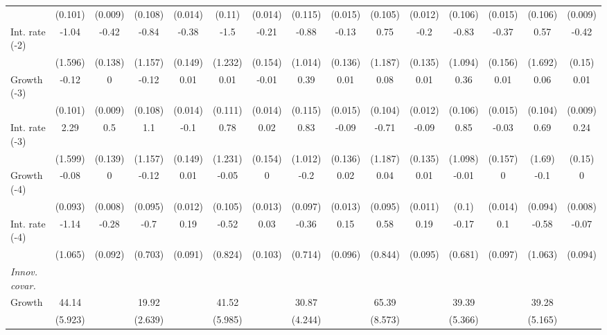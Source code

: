 \begin{table}[htbp]
\begin{tabular}{@{\extracolsep{4pt}}lcccccccccccccc@{}}
 		 & (0.101) 	 & (0.009) 	 & (0.108) 	 & (0.014) 	 & (0.11) 	 & (0.014) 	 & (0.115) 	 & (0.015) 	 & (0.105) 	 & (0.012) 	 & (0.106) 	 & (0.015) 	 & (0.106) 	 & (0.009) 	 \\ 
\quad Int. rate (-2) 	 &-1.04 	 & -0.42 	 & -0.84 	 & -0.38 	 & -1.5 	 & -0.21 	 & -0.88 	 & -0.13 	 & 0.75 	 & -0.2 	 & -0.83 	 & -0.37 	 & 0.57 	 & -0.42	 \\ 
 		 & (1.596) 	 & (0.138) 	 & (1.157) 	 & (0.149) 	 & (1.232) 	 & (0.154) 	 & (1.014) 	 & (0.136) 	 & (1.187) 	 & (0.135) 	 & (1.094) 	 & (0.156) 	 & (1.692) 	 & (0.15) 	 \\ 
\quad Growth (-3) 	 &-0.12 	 & 0 	 & -0.12 	 & 0.01 	 & 0.01 	 & -0.01 	 & 0.39 	 & 0.01 	 & 0.08 	 & 0.01 	 & 0.36 	 & 0.01 	 & 0.06 	 & 0.01	 \\ 
 		 & (0.101) 	 & (0.009) 	 & (0.108) 	 & (0.014) 	 & (0.111) 	 & (0.014) 	 & (0.115) 	 & (0.015) 	 & (0.104) 	 & (0.012) 	 & (0.106) 	 & (0.015) 	 & (0.104) 	 & (0.009) 	 \\ 
\quad Int. rate (-3) 	 &2.29 	 & 0.5 	 & 1.1 	 & -0.1 	 & 0.78 	 & 0.02 	 & 0.83 	 & -0.09 	 & -0.71 	 & -0.09 	 & 0.85 	 & -0.03 	 & 0.69 	 & 0.24	 \\ 
 		 & (1.599) 	 & (0.139) 	 & (1.157) 	 & (0.149) 	 & (1.231) 	 & (0.154) 	 & (1.012) 	 & (0.136) 	 & (1.187) 	 & (0.135) 	 & (1.098) 	 & (0.157) 	 & (1.69) 	 & (0.15) 	 \\ 
\quad Growth (-4) 	 &-0.08 	 & 0 	 & -0.12 	 & 0.01 	 & -0.05 	 & 0 	 & -0.2 	 & 0.02 	 & 0.04 	 & 0.01 	 & -0.01 	 & 0 	 & -0.1 	 & 0	 \\ 
 		 & (0.093) 	 & (0.008) 	 & (0.095) 	 & (0.012) 	 & (0.105) 	 & (0.013) 	 & (0.097) 	 & (0.013) 	 & (0.095) 	 & (0.011) 	 & (0.1) 	 & (0.014) 	 & (0.094) 	 & (0.008) 	 \\ 
\quad Int. rate (-4) 	 &-1.14 	 & -0.28 	 & -0.7 	 & 0.19 	 & -0.52 	 & 0.03 	 & -0.36 	 & 0.15 	 & 0.58 	 & 0.19 	 & -0.17 	 & 0.1 	 & -0.58 	 & -0.07	 \\ 
 		 & (1.065) 	 & (0.092) 	 & (0.703) 	 & (0.091) 	 & (0.824) 	 & (0.103) 	 & (0.714) 	 & (0.096) 	 & (0.844) 	 & (0.095) 	 & (0.681) 	 & (0.097) 	 & (1.063) 	 & (0.094) 	 \\ 
\rule{0pt}{4ex} \emph{Innov. covar.}  	 & 	 & 	 & 	 & 	 & 	 & 	 & 	 & 	 & 	 & 	 & 	 & 	 & 	 &\\ 
\quad Growth 	 &44.14 	 &  	 & 19.92 	 &  	 & 41.52 	 &  	 & 30.87 	 &  	 & 65.39 	 &  	 & 39.39 	 &  	 & 39.28 	 & 	 \\ 
 		 & (5.923) 	 &  	 & (2.639) 	 &  	 & (5.985) 	 &  	 & (4.244) 	 &  	 & (8.573) 	 &  	 & (5.366) 	 &  	 & (5.165) 	 &  	 \\ 

\end{tabular}
\end{table}
